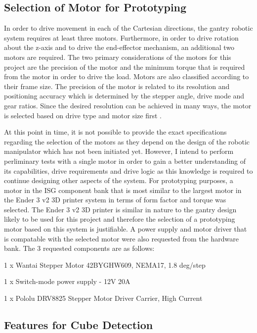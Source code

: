 \subsection{Selection of Motor for Prototyping}

In order to drive movement in each of the Cartesian directions, the gantry robotic system requires at least three motors. Furthermore, in order to drive rotation about the z-axis and to drive the end-effector mechanism, an additional two motors are required. The two primary considerations of the motors for this project are the precision of the motor and the minimum torque that is required from the motor in order to drive the load. Motors are also classified according to their frame size. The precision of the motor is related to its resolution and positioning accuracy which is determined by the stepper angle, drive mode and gear ratios. Since the desired resolution can be achieved in many ways, the motor is selected based on drive type and motor size first \cite{MotionControlProducts}.

At this point in time, it is not possible to provide the exact specifications regarding the selection of the motors as they depend on the design of the robotic manipulator which has not been initiated yet. However, I intend to perform perliminary tests with a single motor in order to gain a better understanding of its capabilities, drive requirements and drive logic as this knowledge is required to continue designing other aspects of the system. For prototyping purposes, a motor in the ISG component bank that is most similar to the largest motor in the Ender 3 v2 3D printer system in terms of form factor and torque was selected. The Ender 3 v2 3D printer is similar in nature to the gantry design likely to be used for this project and therefore the selection of a prototyping motor based on this system is justifiable. A power supply and motor driver that is compatable with the selected motor were also requested from the hardware bank. The 3 requested components are as follows:

\begin{compactitem}
    \item 1 x Wantai Stepper Motor 42BYGHW609, NEMA17, 1.8 deg/step
    \item 1 x Switch-mode power supply - 12V 20A
    \item 1 x Pololu DRV8825 Stepper Motor Driver Carrier, High Current
\end{compactitem}

\subsection{Features for Cube Detection}

